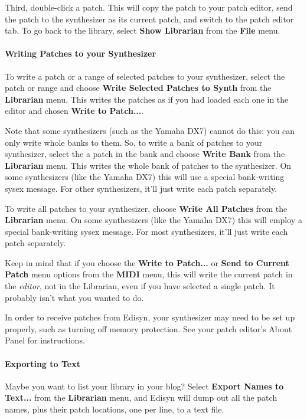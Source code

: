 \documentclass{article}
\begin{document}
Third, double-click a patch.  This will copy the patch to your patch editor, send the patch to the synthesizer as its current patch, and switch to the patch editor tab.  To go back to the library, select {\bf Show Librarian} from the {\bf File} menu.


\paragraph{Writing Patches to your Synthesizer}

To write a patch or a range of selected patches to your synthesizer, select the patch or range and choose {\bf Write Selected Patches to Synth} from the {\bf Librarian} menu.  This writes the patches as if you had loaded each one in the editor and chosen {\bf Write to Patch...}.  

Note that some synthesizers (such as the Yamaha DX7) cannot do this: you can only write whole banks to them.  So, to write a bank of patches to your synthesizer, select the a patch in the bank and choose {\bf Write Bank} from the {\bf Librarian} menu.  This writes the whole bank of patches to the synthesizer.  On some synthesizers (like the Yamaha DX7) this will use a special bank-writing sysex message. For other synthesizers, it'll just write each patch separately.

To write all patches to your synthesizer, choose {\bf Write All Patches} from the {\bf Librarian} menu.  On some synthesizers (like the Yamaha DX7) this will employ a special bank-writing sysex message. For most synthesizers, it'll just write each patch separately.  

Keep in mind that if you choose the {\bf Write to Patch...} or {\bf Send to Current Patch} menu options from the {\bf MIDI} menu, this will write the current patch in the {\it editor}, not in the Librarian, even if you have selected a single patch.  It probably isn't what you wanted to do.

In order to receive patches from Edisyn, your synthesizer may need to be set up properly, such as turning off memory protection. See your patch editor's About Panel for instructions.

\paragraph{Exporting to Text}
Maybe you want to list your library in your blog?  Select {\bf Export Names to Text...} from the {\bf Librarian} menu, and Edisyn will dump out all the patch names, plus their patch locations, one per line, to a text file.
\end{document}
